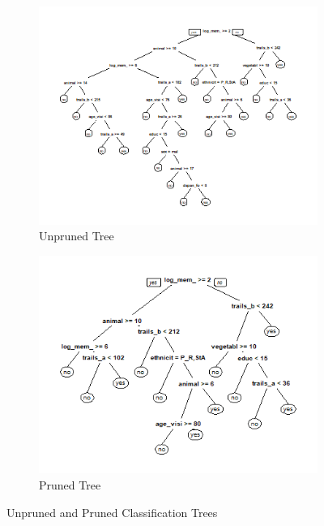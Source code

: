 \documentclass[a4paper,man,natbib,11pt]{article}
\begin{document}
\begin{figure}
\centering
\begin{subfigure}{.5\textwidth}
  \centering
  \includegraphics[width=\linewidth]{unpruned_tree.png}
  \caption{Unpruned Tree}
  \label{fig:sub1}
\end{subfigure}%
\begin{subfigure}{.5\textwidth}
  \centering
  \includegraphics[width=\linewidth]{pruned_tree.png}
  \caption{Pruned Tree}
  \label{fig:sub2}
\end{subfigure}
\caption{Unpruned and Pruned Classification Trees}
\label{fig:test}
\end{figure}
\end{document}
